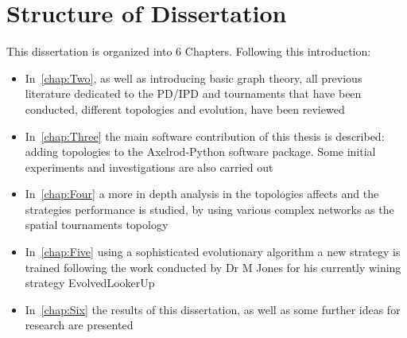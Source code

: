 \section{Structure of Dissertation}
This dissertation is organized into 6 Chapters. Following this introduction:
\begin{itemize}
  \item In~\autoref{chap:Two}, as well as introducing basic graph theory, all
        previous literature dedicated to the PD/IPD and tournaments that have
        been conducted, different topologies and evolution, have been reviewed
  \item In~\autoref{chap:Three} the main software contribution of this thesis is
        described: adding topologies to the Axelrod-Python software package.
        Some initial experiments and investigations are also carried out
  \item In~\autoref{chap:Four} a more in depth analysis in the topologies affects
				and the strategies performance is studied, by using various complex
				networks as the spatial tournaments topology
  \item In~\autoref{chap:Five} using a sophisticated evolutionary algorithm a
				new strategy is trained following the work conducted by Dr M Jones
				for his currently wining strategy EvolvedLookerUp
  \item In~\autoref{chap:Six} the results of this dissertation, as well as some
				further ideas for research are presented
\end{itemize}
